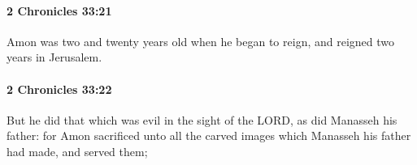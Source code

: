 		\paragraph{2 Chronicles 33:21} %
			\label{2CHRONICLES-33-21}

			Amon was two and twenty years old when he began to reign, and reigned two years in Jerusalem.


		\paragraph{2 Chronicles 33:22} %
			\label{2CHRONICLES-33-22}

			But he did that which was evil in the sight of the LORD, as did Manasseh his father: for Amon sacrificed unto all the carved images which Manasseh his father had made, and served them;


